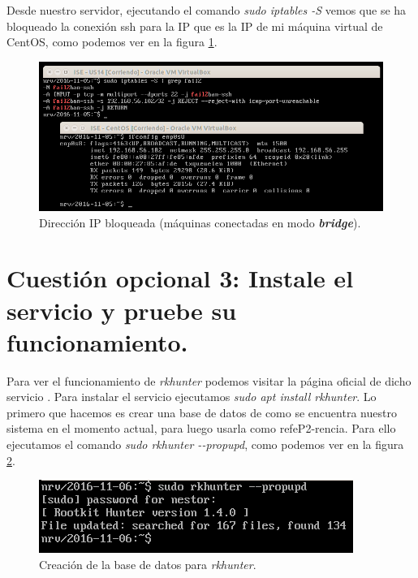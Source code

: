 \documentclass[a4paper,titlepage,12pt]{report}	%
\numberwithin{figure}{section} %
\numberwithin{table}{section} %
\begin{document}
	Desde nuestro servidor, ejecutando el comando \textit{sudo iptables -S} vemos que se ha bloqueado la conexión ssh para la IP \textit{} que es la IP de mi máquina virtual de CentOS, como podemos ver en la figura \ref{P2-O2-iptables}.
	\begin{figure}[H]
		\includegraphics[width=\linewidth]{./Imagenes/P2/O2-iptables.png}
		\vspace{-0.5cm}
		\caption[Dirección IP bloqueada (máquinas conectadas en modo \textit{\textbf{bridge}}).]{Dirección IP bloqueada (máquinas conectadas en modo \textit{\textbf{bridge}}).}
		\label{P2-O2-iptables}
	\end{figure}

	\section[Cuestión opcional 3: Instale el servicio y pruebe su funcionamiento.]{Cuestión opcional 3: Instale el servicio y pruebe su funcionamiento.}

	Para ver el funcionamiento de \textit{rkhunter} podemos visitar la página oficial de dicho servicio \cite{rkhunter}. Para instalar el servicio ejecutamos \textit{sudo apt install rkhunter}. Lo primero que hacemos es crear una base de datos de como se encuentra nuestro sistema en el momento actual, para luego usarla como refeP2-rencia. Para ello ejecutamos el comando \textit{sudo rkhunter {-}-propupd}, como podemos ver en la figura \ref{P2-O3-propupd}.
	\begin{figure}[H]
		\includegraphics[width=\linewidth]{./Imagenes/P2/O3-propupd.png}
		\vspace{-0.5cm}
		\caption[Creación de la base de datos para \textit{rkhunter}.]{Creación de la base de datos para \textit{rkhunter}.}
		\label{P2-O3-propupd}
	\end{figure}
\end{document}
